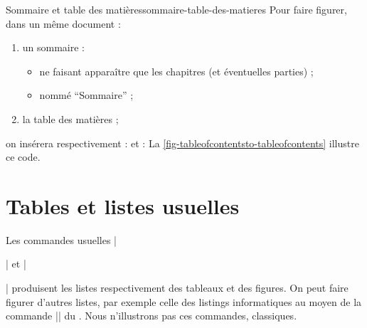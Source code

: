 \begin{dbexample}{Sommaire et table des matières}{sommaire-table-des-matieres}
  Pour faire figurer, dans un même document :
  \begin{enumerate}
  \item un sommaire :
    \begin{itemize}
    \item ne faisant apparaître que les chapitres (et éventuelles parties) ;
    \item nommé \enquote{Sommaire} ;
    \end{itemize}
  \item la table des matières ;
  \end{enumerate}
  on insérera respectivement :
  et :
  La \vref{fig-tableofcontentsto-tableofcontents} illustre ce code.
\end{dbexample}


\section{Tables et listes usuelles}
%
%
%
%
%
%
%

Les commandes usuelles |\listoftables| et |\listoffigures| produisent les
listes respectivement des tableaux et des figures.
%
On peut faire figurer d'autres listes, par exemple celle des listings
informatiques au moyen de la commande |\lstlistoflistings| du
.
%
Nous n'illustrons pas ces commandes, classiques.

